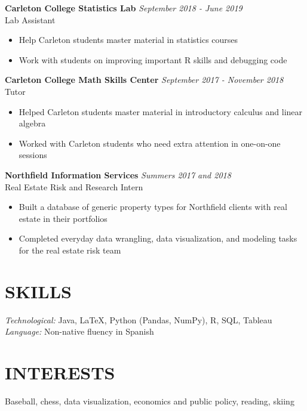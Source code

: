\documentclass[margin, 9pt]{res} %
\begin{document}
\begin{resume}
{\sl} \textbf{Carleton College Statistics Lab} \hfill \textit{September 2018 - June 2019}\\
{\sl} Lab Assistant \smallskip
{\sl} \begin{itemize}
\item Help Carleton students master material in statistics courses
\item Work with students on improving important R skills and debugging code
\end{itemize}

{\sl} \textbf{Carleton College Math Skills Center} \hfill \textit{September 2017 - November 2018}\\
{\sl} Tutor \smallskip
{\sl} \begin{itemize}
\item Helped Carleton students master material in introductory calculus and linear algebra
\item Worked with Carleton students who need extra attention in one-on-one sessions
\end{itemize}

{\sl} \textbf{Northfield Information Services} \hfill \textit{Summers 2017 and 2018}\\
{\sl} Real Estate Risk and Research Intern \smallskip
{\sl} \begin{itemize}
\item Built a database of generic property types for Northfield clients with real estate in their portfolios
\item Completed everyday data wrangling, data visualization, and modeling tasks for the real estate risk team
\end{itemize}


\section{SKILLS}
{\sl Technological:} Java, LaTeX, Python (Pandas, NumPy), R, SQL, Tableau\\ \smallskip
{\sl Language:} Non-native fluency in Spanish

\section{INTERESTS}
{\sl} Baseball, chess, data visualization, economics and public policy, reading, skiing

\end{resume}
\end{document}
